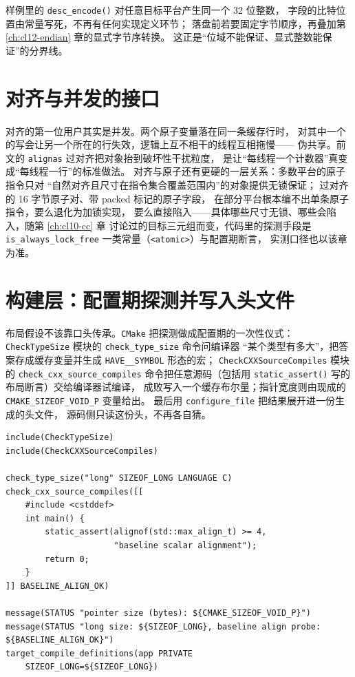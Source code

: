 \documentclass[12pt,a4paper,fontset=fandol]{ctexbook}
\newcommand{\Fn}[1]{\texttt{#1()}}
\newcommand{\Tp}[1]{\texttt{#1}}
\newcommand{\Bk}{\discretionary{}{}{}}
\newcommand{\Tool}[1]{\texttt{#1}}
\begin{document}
样例里的 \Fn{desc\_encode} 对任意目标平台产生同一个 32 位整数，
字段的比特位置由常量写死，不再有任何实现定义环节；
落盘前若要固定字节顺序，再叠加第 \ref{ch:cl12-endian} 章的显式字节序转换。
这正是“位域不能保证、显式整数能保证”的分界线。

\section{对齐与并发的接口}\label{sec:cl11-align-concurrency}

对齐的第一位用户其实是并发。两个原子变量落在同一条缓存行时，
对其中一个的写会让另一个所在的行失效，逻辑上互不相干的线程互相拖慢——
伪共享。前文的 \Tp{alignas} 过对齐把对象抬到破坏性干扰粒度，
是让“每线程一个计数器”真变成“每线程一行”的标准做法。
对齐与原子还有更硬的一层关系：多数平台的原子指令只对
“自然对齐且尺寸在指令集合覆盖范围内”的对象提供无锁保证；
过对齐的 16 字节原子对、带 packed 标记的原子字段，
在部分平台根本编不出单条原子指令，要么退化为加锁实现，
要么直接陷入——具体哪些尺寸无锁、哪些会陷入，随第 \ref{ch:cl10-cc} 章
讨论过的目标三元组而变，代码里的探测手段是
\Tp{is\_always\_lock\_free} 一类常量（\Tp{<atomic>}）与配置期断言，
实测口径也以该章为准。

\section{构建层：配置期探测并写入头文件}\label{sec:cl11-cmake-probe}

布局假设不该靠口头传承。\Tool{CMake} 把探测做成配置期的一次性仪式：
\Tool{CheckTypeSize} 模块的 \Tool{check\_type\_size} 命令问编译器
“某个类型有多大”，把答案存成缓存变量并生成 \Tp{HAVE\_\_SYMBOL} 形态的宏；
\Tool{CheckCXXSourceCompiles} 模块的 \Tool{check\_cxx\_source\_compiles}
命令把任意源码（包括用 \Fn{static\_assert} 写的布局断言）交给编译器试编译，
成败写入一个缓存布尔量；指针宽度则由现成的
\Tp{CMAKE{\Bk}\_SIZEOF{\Bk}\_VOID{\Bk}\_P} 变量给出。
最后用 \Tool{configure\_file} 把结果展开进一份生成的头文件，
源码侧只读这份头，不再各自猜。

\begin{lstlisting}[style=cmakestyle, caption={配置期探测布局事实并注入编译定义}]
include(CheckTypeSize)
include(CheckCXXSourceCompiles)

check_type_size("long" SIZEOF_LONG LANGUAGE C)
check_cxx_source_compiles([[
    #include <cstddef>
    int main() {
        static_assert(alignof(std::max_align_t) >= 4,
                      "baseline scalar alignment");
        return 0;
    }
]] BASELINE_ALIGN_OK)

message(STATUS "pointer size (bytes): ${CMAKE_SIZEOF_VOID_P}")
message(STATUS "long size: ${SIZEOF_LONG}, baseline align probe: ${BASELINE_ALIGN_OK}")
target_compile_definitions(app PRIVATE
    SIZEOF_LONG=${SIZEOF_LONG})
\end{lstlisting}
\end{document}
